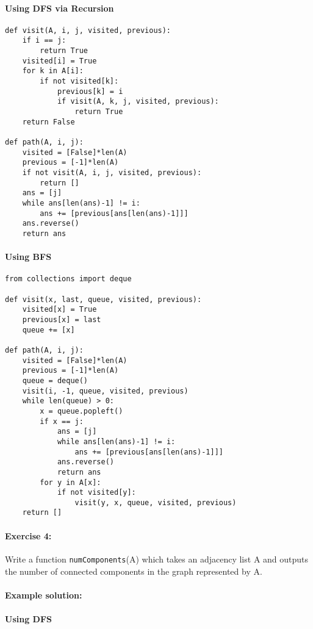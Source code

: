 \documentclass[11pt]{article}
\begin{document}
\paragraph{Using DFS via Recursion}

\begin{verbatim}
def visit(A, i, j, visited, previous):
    if i == j:
        return True
    visited[i] = True
    for k in A[i]:
        if not visited[k]:
            previous[k] = i
            if visit(A, k, j, visited, previous):
                return True
    return False

def path(A, i, j):
    visited = [False]*len(A)
    previous = [-1]*len(A)
    if not visit(A, i, j, visited, previous):
        return []
    ans = [j]
    while ans[len(ans)-1] != i:
        ans += [previous[ans[len(ans)-1]]]
    ans.reverse()
    return ans
\end{verbatim}

\paragraph{Using BFS}
\begin{verbatim}
from collections import deque

def visit(x, last, queue, visited, previous):
    visited[x] = True
    previous[x] = last
    queue += [x]

def path(A, i, j):
    visited = [False]*len(A)
    previous = [-1]*len(A)
    queue = deque()
    visit(i, -1, queue, visited, previous)
    while len(queue) > 0:
        x = queue.popleft()
        if x == j:
            ans = [j]
            while ans[len(ans)-1] != i:
                ans += [previous[ans[len(ans)-1]]]
            ans.reverse()
            return ans
        for y in A[x]:
            if not visited[y]:
                visit(y, x, queue, visited, previous)
    return []
\end{verbatim}

\paragraph{Exercise 4:}
Write a function \texttt{numComponents}(A) which takes an adjacency
list A and outputs the number of connected components in the graph
represented by A.

\paragraph{Example solution:}
\paragraph{Using DFS}
\end{document}
